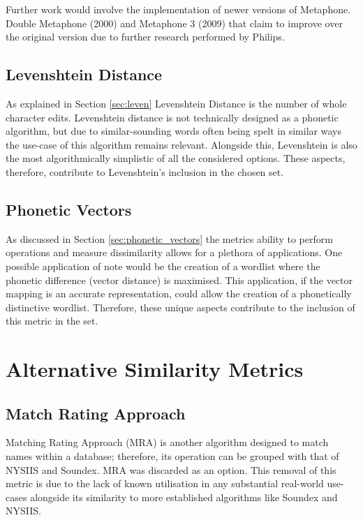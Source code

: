 Further work would involve the implementation of newer versions of Metaphone. Double Metaphone (2000) and
Metaphone 3 (2009) that claim to improve over the original version due to further research performed by Philips. 

\subsection{Levenshtein Distance}
As explained in Section \ref{sec:leven} Levenshtein Distance is the number of whole character edits. Levenshtein distance is not technically designed as a phonetic algorithm, but due to similar-sounding words often being spelt in similar ways\cite{hettiarachchi2012sparcl} the use-case of this algorithm remains relevant. Alongside this, Levenshtein is also the most algorithmically simplistic of all the considered options. These aspects, therefore, contribute to Levenshtein's inclusion in the chosen set.

\subsection{Phonetic Vectors}
As discussed in Section \ref{sec:phonetic_vectors} the metrics ability to perform operations and measure dissimilarity allows for a plethora of applications. One possible application of note would be the creation of a wordlist where the phonetic difference (vector distance) is maximised. This application, if the vector mapping is an accurate representation, could allow the creation of a phonetically distinctive wordlist. Therefore, these unique aspects contribute to the inclusion of this metric in the set.

\section{Alternative Similarity Metrics}

\subsection{Match Rating Approach}
Matching Rating Approach (MRA) is another algorithm designed to match names within a database; therefore, its operation can be grouped with that of NYSIIS and Soundex. MRA was discarded as an option. This removal of this metric is due to the lack of known utilisation in any substantial real-world use-cases alongside its similarity to  more established algorithms like Soundex and NYSIIS.

